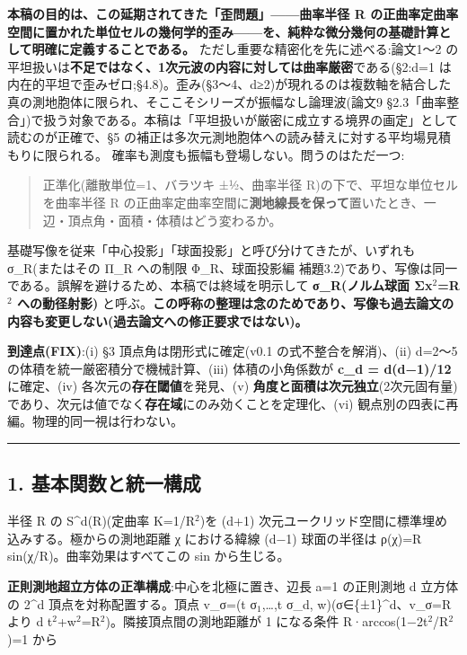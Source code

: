 \documentclass[
]{ltjsarticle}
\begin{document}
\textbf{本稿の目的は、この延期されてきた「歪問題」------曲率半径 R
の正曲率定曲率空間に置かれた単位セルの幾何学的歪み------を、純粋な微分幾何の基礎計算として明確に定義することである。}
ただし重要な精密化を先に述べる:論文1〜2
の平坦扱いは\textbf{不足ではなく、1次元波の内容に対しては曲率厳密}である(§2:d=1
は内在的平坦で歪みゼロ;§4.8)。歪み(§3〜4、d≥2)が現れるのは複数軸を結合した真の測地胞体に限られ、そここそシリーズが振幅なし論理波(論文9
§2.3「曲率整合」)で扱う対象である。本稿は「平坦扱いが厳密に成立する境界の画定」として読むのが正確で、§5
の補正は多次元測地胞体への読み替えに対する平均場見積もりに限られる。
確率も測度も振幅も登場しない。問うのはただ一つ:

\begin{quote}
正準化(離散単位=1、バラツキ ±½、曲率半径
R)の下で、平坦な単位セルを曲率半径 R
の正曲率定曲率空間に\textbf{測地線長を保って}置いたとき、一辺・頂点角・面積・体積はどう変わるか。
\end{quote}

基礎写像を従来「中心投影」「球面投影」と呼び分けてきたが、いずれも
σ\_R(またはその Π\_R への制限 Φ\_R、球面投影編
補題3.2)であり、写像は同一である。誤解を避けるため、本稿では終域を明示して
\textbf{σ\_R(ノルム球面 Σx\(^{2}\)=R\(^{2}\) への動径射影)}
と呼ぶ。\textbf{この呼称の整理は念のためであり、写像も過去論文の内容も変更しない(過去論文への修正要求ではない)。}

\textbf{到達点(FIX)}:(i) §3 頂点角は閉形式に確定(v0.1
の式不整合を解消)、(ii) d=2〜5 の体積を統一厳密積分で機械計算、(iii)
体積の小角係数が \textbf{c\_d = d(d−1)/12} に確定、(iv)
各次元の\textbf{存在閾値}を発見、(v)
\textbf{角度と面積は次元独立}(2次元固有量)であり、次元は値でなく\textbf{存在域}にのみ効くことを定理化、(vi)
観点別の四表に再編。物理的同一視は行わない。

\begin{center}\rule{0.5\linewidth}{0.5pt}\end{center}

\subsection{1.
基本関数と統一構成}\label{ux57faux672cux95a2ux6570ux3068ux7d71ux4e00ux69cbux6210}

半径 R の S\^{}d(R)(定曲率 K=1/R\(^{2}\))を (d+1)
次元ユークリッド空間に標準埋め込みする。極からの測地距離 χ における緯線
(d−1) 球面の半径は ρ(χ)=R sin(χ/R)。曲率効果はすべてこの sin
から生じる。

\textbf{正則測地超立方体の正準構成}:中心を北極に置き、辺長 a=1
の正則測地 d 立方体の 2\^{}d 頂点を対称配置する。頂点 v\_σ=(t
σ\(_{1}\),\ldots,t σ\_d, w)(σ∈\{±1\}\^{}d、\textbar v\_σ\textbar=R より
d t\(^{2}\)+w\(^{2}\)=R\(^{2}\))。隣接頂点間の測地距離が 1 になる条件
R·arccos(1−2t\(^{2}\)/R\(^{2}\))=1 から
\end{document}
